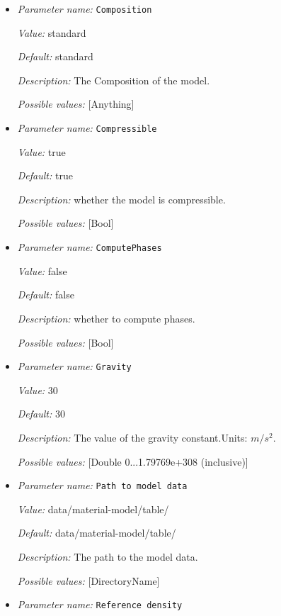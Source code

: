 \begin{itemize}
\item {\it Parameter name:} {\tt Composition}


{\it Value:} standard


{\it Default:} standard


{\it Description:} The Composition of the model. 


{\it Possible values:} [Anything]
\item {\it Parameter name:} {\tt Compressible}


{\it Value:} true


{\it Default:} true


{\it Description:} whether the model is compressible. 


{\it Possible values:} [Bool]
\item {\it Parameter name:} {\tt ComputePhases}


{\it Value:} false


{\it Default:} false


{\it Description:} whether to compute phases. 


{\it Possible values:} [Bool]
\item {\it Parameter name:} {\tt Gravity}


{\it Value:} 30


{\it Default:} 30


{\it Description:} The value of the gravity constant.Units: $m/s^2$.


{\it Possible values:} [Double 0...1.79769e+308 (inclusive)]
\item {\it Parameter name:} {\tt Path to model data}


{\it Value:} data/material-model/table/


{\it Default:} data/material-model/table/


{\it Description:} The path to the model data. 


{\it Possible values:} [DirectoryName]
\item {\it Parameter name:} {\tt Reference density}



\end{itemize}

